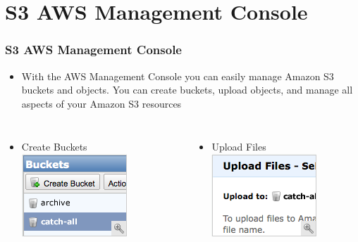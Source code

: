 \documentclass{beamer}
\begin{document}
\section{S3 AWS Management Console}
\begin{frame}[fragile]
\frametitle{S3 AWS Management Console}
\begin{itemize}
\item With the AWS Management Console you can easily manage Amazon S3 buckets and objects. You can create buckets, upload objects, and manage all aspects of your Amazon S3 resources
\end{itemize}

\begin{columns}
 \begin{itemize}
 \item Create Buckets
\includegraphics[width= 0.75 \textwidth]{console_thumb_s3_01.png}
 \end{itemize}
\begin{itemize}
 \item Upload Files
\includegraphics[width= 0.75 \textwidth]{console_thumb_s3_02.png}

\end{itemize}
\end{columns}
\end{frame}
\end{document}
